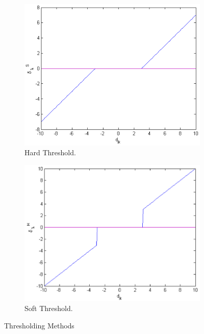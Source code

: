 \documentclass{article}\raggedbottom
\begin{document}
\begin{figure}[h!]
	\centering
	\begin{subfigure}[b]{0.4\linewidth}
		\includegraphics[width=\linewidth]{../../1_Resources/images/hard_thresholding.png}
		\caption{Hard Threshold.}
	\end{subfigure}
	\begin{subfigure}[b]{0.4\linewidth}
		\includegraphics[width=\linewidth]{../../1_Resources/images/soft_thresholding.png}
		\caption{Soft Threshold.}
	\end{subfigure}	
	\caption{Thresholding Methods}
	\label{fig:thresholding}
\end{figure}
\end{document}

